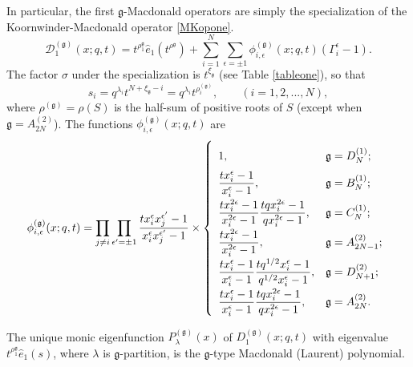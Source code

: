 \documentclass[12pt]{amsart}
\newcommand{\g}{{\mathfrak{g}}}
\newcommand{\D}{{\mathcal{D}}}
\numberwithin{equation}{section}
\begin{document}
In particular, the first $\g$-Macdonald operators are simply the specialization of the Koornwinder-Macdonald operator \eqref{MKopone}. 
\begin{equation}
\D_1^{(\g)}(x;q,t) = t^{\rho_1^\g} \hat e_1(t^{\rho^\g}) + \sum_{i=1}^N \sum_{\epsilon=\pm1} \phi_{i,\epsilon}^{(\g)}(x;q,t) (\Gamma_i^\epsilon -1).
\end{equation}\label{macdops}
The factor $\sigma$ under the specialization is $t^{\xi_\g}$ (see Table \ref{tableone}), so that 
\begin{equation}\label{svarg}
s_i=q^{\lambda_i} t^{N+\xi_\g-i}=q^{\lambda_i} t^{\rho_i^{(\g)}}, \qquad (i=1,2,...,N) ,\end{equation}
where $\rho^{(\g)}=\rho(S)$ is the half-sum of positive roots of $S$ (except when $\g=A_{2N}^{(2)}$).
%
%
The functions $\phi_{i,\epsilon}^{(\g)} (x;q,t)$ are
\begin{eqnarray*}\renewcommand{\arraystretch}{2}
\phi_{i,\epsilon}^{(\g)} (x;q,t) = \prod_{j\neq i}\prod_{\epsilon'=\pm1}
\frac{t x_i^\epsilon x_j^{\epsilon'}-1}{x_i^\epsilon x_j^{\epsilon'}-1}\times
\left\{
\begin{array}{l l}\renewcommand{\arraystretch}{2}
1 , &\g= D_N^{(1)};\\ 
\displaystyle{\frac{t x_i^\epsilon-1}{x_i^\epsilon-1}}, & \g=B_N^{(1)};\\
\displaystyle{\frac{t x_i^{2\epsilon}-1}{x_i^{2\epsilon}-1}\frac{t q x_i^{2\epsilon}-1}{q x_i^{2\epsilon}-1}}, & \g=C_N^{(1)};\\
\displaystyle{\frac{t x_i^{2\epsilon}-1}{x_i^{2\epsilon}-1}}, & \g=A_{2N-1}^{(2)};\\
\displaystyle{\frac{t x_i^{\epsilon}-1}{x_i^{\epsilon}-1}\frac{t q^{1/2} x_i^{\epsilon}-1}{q^{1/2} x_i^{\epsilon}-1}}, & \g=D_{N+1}^{(2)};\\
\displaystyle{\frac{t x_i^{\epsilon}-1}{x_i^{\epsilon}-1}\frac{t q x_i^{2\epsilon}-1}{q x_i^{2\epsilon}-1}}, & \g=A_{2N}^{(2)}.\\
\end{array}
\right.
\end{eqnarray*}

%
%
%
%
%
%
%
%
%
%
%
%
%
%
%
%
%
%
%
%
%
%
%
%
%
%
%
%
%

The unique monic eigenfunction $P_\lambda^{(\g)}(x)$ of $D_1^{(\g)}(x;q,t)$ with eigenvalue $t^{\rho^\g_1} \hat{e}_1(s)$, where $\lambda$ is $\g$-partition, is the $\g$-type Macdonald (Laurent) polynomial. 
\end{document}
